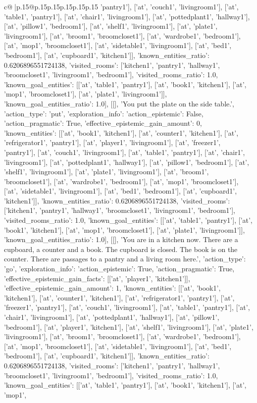 \documentclass{article}
\begin{document}
{\begin{supertabular}{c@{$\;$}|p{.15\linewidth}@{}p{.15\linewidth}p{.15\linewidth}p{.15\linewidth}p{.15\linewidth}p{.15\linewidth}}
{{{'pantry1'], ['at', 'couch1', 'livingroom1'], ['at', 'table1', 'pantry1'], ['at', 'chair1', 'livingroom1'], ['at', 'pottedplant1', 'hallway1'], ['at', 'pillow1', 'bedroom1'], ['at', 'shelf1', 'livingroom1'], ['at', 'plate1', 'livingroom1'], ['at', 'broom1', 'broomcloset1'], ['at', 'wardrobe1', 'bedroom1'], ['at', 'mop1', 'broomcloset1'], ['at', 'sidetable1', 'livingroom1'], ['at', 'bed1', 'bedroom1'], ['at', 'cupboard1', 'kitchen1']], 'known_entities_ratio': 0.6206896551724138, 'visited_rooms': ['kitchen1', 'pantry1', 'hallway1', 'broomcloset1', 'livingroom1', 'bedroom1'], 'visited_rooms_ratio': 1.0, 'known_goal_entities': [['at', 'table1', 'pantry1'], ['at', 'book1', 'kitchen1'], ['at', 'mop1', 'broomcloset1'], ['at', 'plate1', 'livingroom1']], 'known_goal_entities_ratio': 1.0}}], [[], 'You put the plate on the side table.', {'action_type': 'put', 'exploration_info': {'action_epistemic': False, 'action_pragmatic': True, 'effective_epistemic_gain_amount': 0, 'known_entities': [['at', 'book1', 'kitchen1'], ['at', 'counter1', 'kitchen1'], ['at', 'refrigerator1', 'pantry1'], ['at', 'player1', 'livingroom1'], ['at', 'freezer1', 'pantry1'], ['at', 'couch1', 'livingroom1'], ['at', 'table1', 'pantry1'], ['at', 'chair1', 'livingroom1'], ['at', 'pottedplant1', 'hallway1'], ['at', 'pillow1', 'bedroom1'], ['at', 'shelf1', 'livingroom1'], ['at', 'plate1', 'livingroom1'], ['at', 'broom1', 'broomcloset1'], ['at', 'wardrobe1', 'bedroom1'], ['at', 'mop1', 'broomcloset1'], ['at', 'sidetable1', 'livingroom1'], ['at', 'bed1', 'bedroom1'], ['at', 'cupboard1', 'kitchen1']], 'known_entities_ratio': 0.6206896551724138, 'visited_rooms': ['kitchen1', 'pantry1', 'hallway1', 'broomcloset1', 'livingroom1', 'bedroom1'], 'visited_rooms_ratio': 1.0, 'known_goal_entities': [['at', 'table1', 'pantry1'], ['at', 'book1', 'kitchen1'], ['at', 'mop1', 'broomcloset1'], ['at', 'plate1', 'livingroom1']], 'known_goal_entities_ratio': 1.0}}], [[], 'You are in a kitchen now. There are a cupboard, a counter and a book. The cupboard is closed. The book is on the counter. There are passages to a pantry and a living room here.', {'action_type': 'go', 'exploration_info': {'action_epistemic': True, 'action_pragmatic': True, 'effective_epistemic_gain_facts': [['at', 'player1', 'kitchen1']], 'effective_epistemic_gain_amount': 1, 'known_entities': [['at', 'book1', 'kitchen1'], ['at', 'counter1', 'kitchen1'], ['at', 'refrigerator1', 'pantry1'], ['at', 'freezer1', 'pantry1'], ['at', 'couch1', 'livingroom1'], ['at', 'table1', 'pantry1'], ['at', 'chair1', 'livingroom1'], ['at', 'pottedplant1', 'hallway1'], ['at', 'pillow1', 'bedroom1'], ['at', 'player1', 'kitchen1'], ['at', 'shelf1', 'livingroom1'], ['at', 'plate1', 'livingroom1'], ['at', 'broom1', 'broomcloset1'], ['at', 'wardrobe1', 'bedroom1'], ['at', 'mop1', 'broomcloset1'], ['at', 'sidetable1', 'livingroom1'], ['at', 'bed1', 'bedroom1'], ['at', 'cupboard1', 'kitchen1']], 'known_entities_ratio': 0.6206896551724138, 'visited_rooms': ['kitchen1', 'pantry1', 'hallway1', 'broomcloset1', 'livingroom1', 'bedroom1'], 'visited_rooms_ratio': 1.0, 'known_goal_entities': [['at', 'table1', 'pantry1'], ['at', 'book1', 'kitchen1'], ['at', 'mop1', }}}
\end{supertabular}}
\end{document}
